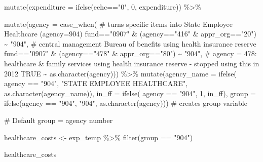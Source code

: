 \documentclass[
  letterpaper,
  DIV=11,
  numbers=noendperiod]{scrreport}
\newenvironment{Shaded}{\begin{snugshade}}{\end{snugshade}}
\newcommand{\AttributeTok}[1]{\textcolor[rgb]{0.40,0.45,0.13}{#1}}
\newcommand{\CommentTok}[1]{\textcolor[rgb]{0.37,0.37,0.37}{#1}}
\newcommand{\ConstantTok}[1]{\textcolor[rgb]{0.56,0.35,0.01}{#1}}
\newcommand{\DecValTok}[1]{\textcolor[rgb]{0.68,0.00,0.00}{#1}}
\newcommand{\FunctionTok}[1]{\textcolor[rgb]{0.28,0.35,0.67}{#1}}
\newcommand{\NormalTok}[1]{\textcolor[rgb]{0.00,0.23,0.31}{#1}}
\newcommand{\OtherTok}[1]{\textcolor[rgb]{0.00,0.23,0.31}{#1}}
\newcommand{\SpecialCharTok}[1]{\textcolor[rgb]{0.37,0.37,0.37}{#1}}
\newcommand{\StringTok}[1]{\textcolor[rgb]{0.13,0.47,0.30}{#1}}
\begin{document}
\begin{Shaded}
\begin{Highlighting}[]
  \FunctionTok{mutate}\NormalTok{(}\AttributeTok{expenditure =} \FunctionTok{ifelse}\NormalTok{(eehc}\SpecialCharTok{==}\StringTok{"0"}\NormalTok{, }\DecValTok{0}\NormalTok{, expenditure)) }\SpecialCharTok{\%\textgreater{}\%}
  
  \FunctionTok{mutate}\NormalTok{(}\AttributeTok{agency =} \FunctionTok{case\_when}\NormalTok{(   }\CommentTok{\# turns specific items into State Employee Healthcare (agency=904)}
\NormalTok{      fund}\SpecialCharTok{==}\StringTok{"0907"} \SpecialCharTok{\&}\NormalTok{ (agency}\SpecialCharTok{==}\StringTok{"416"} \SpecialCharTok{\&}\NormalTok{ appr\_org}\SpecialCharTok{==}\StringTok{"20"}\NormalTok{) }\SpecialCharTok{\textasciitilde{}} \StringTok{"904"}\NormalTok{,   }\CommentTok{\# central management Bureau of benefits using health insurance reserve }
\NormalTok{      fund}\SpecialCharTok{==}\StringTok{"0907"} \SpecialCharTok{\&}\NormalTok{ (agency}\SpecialCharTok{==}\StringTok{"478"} \SpecialCharTok{\&}\NormalTok{ appr\_org}\SpecialCharTok{==}\StringTok{"80"}\NormalTok{) }\SpecialCharTok{\textasciitilde{}} \StringTok{"904"}\NormalTok{,   }\CommentTok{\# agency = 478: healthcare \& family services using health insurance reserve {-} stopped using this in 2012}
      \ConstantTok{TRUE} \SpecialCharTok{\textasciitilde{}} \FunctionTok{as.character}\NormalTok{(agency))) }\SpecialCharTok{\%\textgreater{}\%}
  \FunctionTok{mutate}\NormalTok{(}\AttributeTok{agency\_name =} \FunctionTok{ifelse}\NormalTok{(}
\NormalTok{    agency }\SpecialCharTok{==} \StringTok{"904"}\NormalTok{, }\StringTok{"STATE EMPLOYEE HEALTHCARE"}\NormalTok{, }\FunctionTok{as.character}\NormalTok{(agency\_name)),}
         \AttributeTok{in\_ff =} \FunctionTok{ifelse}\NormalTok{( agency }\SpecialCharTok{==} \StringTok{"904"}\NormalTok{, }\DecValTok{1}\NormalTok{, in\_ff),}
         \AttributeTok{group =} \FunctionTok{ifelse}\NormalTok{(agency }\SpecialCharTok{==} \StringTok{"904"}\NormalTok{, }\StringTok{"904"}\NormalTok{, }\FunctionTok{as.character}\NormalTok{(agency)))  }
\CommentTok{\# creates group variable}

\CommentTok{\# Default group = agency number}

\NormalTok{healthcare\_costs }\OtherTok{\textless{}{-}}\NormalTok{ exp\_temp }\SpecialCharTok{\%\textgreater{}\%} \FunctionTok{filter}\NormalTok{(group }\SpecialCharTok{==} \StringTok{"904"}\NormalTok{)}

\NormalTok{healthcare\_costs}
\end{Highlighting}
\end{Shaded}
\end{document}
